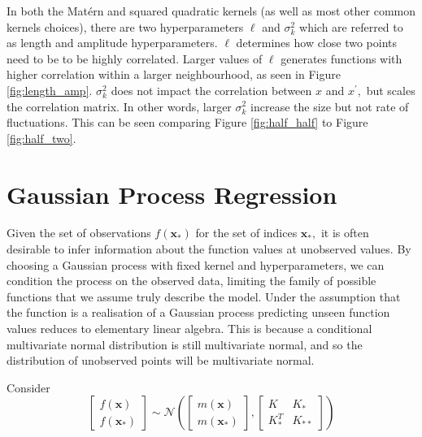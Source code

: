 In both the Mat\'ern and squared quadratic kernels
(as well as most other common kernels choices), there are two
hyperparameters $\ell$ and $\sigma^2_k$ which are referred to as length and
amplitude hyperparameters. $\ell$ determines how close two points need
to be to be highly correlated. Larger values of $\ell$ generates functions with
higher correlation within a larger neighbourhood,
as seen in Figure \ref{fig:length_amp}. $\sigma^2_k$ does not impact
the correlation between $x$ and $x^\prime,$ but scales the correlation
matrix. In other words, larger $\sigma^2_k$ increase the size but not rate of
fluctuations. This can be seen comparing Figure \ref{fig:half_half} to Figure
\ref{fig:half_two}.

\chapter{Gaussian Process Regression}

Given the set of observations $f(\mathbf{x}_*)$ for the set of indices
$\mathbf{x}_*,$ it is
often desirable to infer information about the function values at
unobserved values. By choosing a Gaussian process with fixed kernel and
hyperparameters, we
can condition the process on the observed data, limiting the family of
possible functions that we assume truly describe the model.
Under the assumption that the function is a realisation of a Gaussian
process predicting unseen function values reduces to elementary linear algebra.
This is because a conditional multivariate normal distribution
is still multivariate normal, and so the distribution of unobserved points will
be multivariate normal.

Consider
$$
    \begin{bmatrix}
        f(\mathbf{x}) \\
        f(\mathbf{x}_*)
    \end{bmatrix} \sim \mathcal{N}\left(
    \begin{bmatrix}
            m(\mathbf{x}) \\
            m(\mathbf{x}_*)
        \end{bmatrix}, \begin{bmatrix}
            K       & K_{*}  \\
            K_{*}^T & K_{**}
        \end{bmatrix}
    \right)
$$

